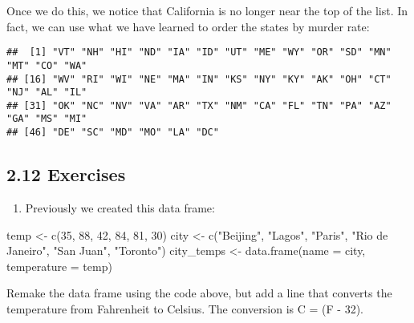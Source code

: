 \documentclass[
]{article}
\newenvironment{Shaded}{\begin{snugshade}}{\end{snugshade}}
\newcommand{\AttributeTok}[1]{\textcolor[rgb]{0.77,0.63,0.00}{#1}}
\newcommand{\DecValTok}[1]{\textcolor[rgb]{0.00,0.00,0.81}{#1}}
\newcommand{\FunctionTok}[1]{\textcolor[rgb]{0.00,0.00,0.00}{#1}}
\newcommand{\NormalTok}[1]{#1}
\newcommand{\OtherTok}[1]{\textcolor[rgb]{0.56,0.35,0.01}{#1}}
\newcommand{\SpecialCharTok}[1]{\textcolor[rgb]{0.00,0.00,0.00}{#1}}
\newcommand{\StringTok}[1]{\textcolor[rgb]{0.31,0.60,0.02}{#1}}
\providecommand{\tightlist}{%
  \setlength{\itemsep}{0pt}\setlength{\parskip}{0pt}}
\begin{document}
Once we do this, we notice that California is no longer near the top of
the list. In fact, we can use what we have learned to order the states
by murder rate:

\begin{Shaded}
\end{Shaded}

\begin{verbatim}
##  [1] "VT" "NH" "HI" "ND" "IA" "ID" "UT" "ME" "WY" "OR" "SD" "MN" "MT" "CO" "WA"
## [16] "WV" "RI" "WI" "NE" "MA" "IN" "KS" "NY" "KY" "AK" "OH" "CT" "NJ" "AL" "IL"
## [31] "OK" "NC" "NV" "VA" "AR" "TX" "NM" "CA" "FL" "TN" "PA" "AZ" "GA" "MS" "MI"
## [46] "DE" "SC" "MD" "MO" "LA" "DC"
\end{verbatim}

\hypertarget{exercises-4}{%
\subsection{2.12 Exercises}\label{exercises-4}}

\begin{enumerate}
\def\labelenumi{\arabic{enumi}.}
\tightlist
\item
  Previously we created this data frame:
\end{enumerate}

\begin{Shaded}
\begin{Highlighting}[]
\NormalTok{temp }\OtherTok{\textless{}{-}} \FunctionTok{c}\NormalTok{(}\DecValTok{35}\NormalTok{, }\DecValTok{88}\NormalTok{, }\DecValTok{42}\NormalTok{, }\DecValTok{84}\NormalTok{, }\DecValTok{81}\NormalTok{, }\DecValTok{30}\NormalTok{)}
\NormalTok{city }\OtherTok{\textless{}{-}} \FunctionTok{c}\NormalTok{(}\StringTok{"Beijing"}\NormalTok{, }\StringTok{"Lagos"}\NormalTok{, }\StringTok{"Paris"}\NormalTok{, }\StringTok{"Rio de Janeiro"}\NormalTok{, }
          \StringTok{"San Juan"}\NormalTok{, }\StringTok{"Toronto"}\NormalTok{)}
\NormalTok{city\_temps }\OtherTok{\textless{}{-}} \FunctionTok{data.frame}\NormalTok{(}\AttributeTok{name =}\NormalTok{ city, }\AttributeTok{temperature =}\NormalTok{ temp)}
\end{Highlighting}
\end{Shaded}

Remake the data frame using the code above, but add a line that converts
the temperature from Fahrenheit to Celsius. The conversion is C =
 \times (F - 32).
\end{document}
